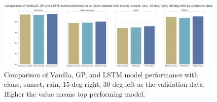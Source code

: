 %		

	\begin{figure}
		\centering
	
		\includegraphics[width=12cm]{images/vkitti_performance_metric_five_categories.png}
		\caption{Comparison of Vanilla, GP, and LSTM model performance with clone, sunset, rain, 15-deg-right, 30-deg-left as the validation data. Higher the value means top performing model.}
		\label{fig:performance_metric_unet}
	\end{figure}

%	
%
%	
%
%	
%
%	

